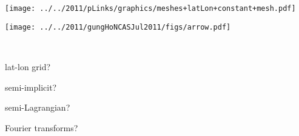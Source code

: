\begin{slide}

\vspace{1cm}

\begin{minipage}{0.6\linewidth}
\texttt{[image: ../../2011/pLinks/graphics/meshes+latLon+constant+mesh.pdf]}

\vspace{-0.55\linewidth} \hspace{2.1in}
\texttt{[image: ../../2011/gungHoNCASJul2011/figs/arrow.pdf]}

\vspace{0.5\linewidth}\ \\
\end{minipage}
\hfill
\begin{minipage}{0.35\linewidth}

\begin{list0}
\item lat-lon grid?
\item semi-implicit?
\item semi-Lagrangian?
\item Fourier transforms?
\end{list0}

\end{minipage}

\end{slide}

